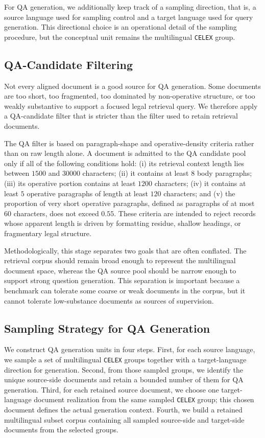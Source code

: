 For QA generation, we additionally keep track of a sampling direction, that is, a source language used for sampling control and a target language used for query generation. This directional choice is an operational detail of the sampling procedure, but the conceptual unit remains the multilingual \texttt{CELEX} group.

\subsection{QA-Candidate Filtering}

Not every aligned document is a good source for QA generation. Some documents are too short, too fragmented, too dominated by non-operative structure, or too weakly substantive to support a focused legal retrieval query. We therefore apply a QA-candidate filter that is stricter than the filter used to retain retrieval documents.

The QA filter is based on paragraph-shape and operative-density criteria rather than on raw length alone. A document is admitted to the QA candidate pool only if all of the following conditions hold: (i) its retrieval context length lies between \(1500\) and \(30000\) characters; (ii) it contains at least \(8\) body paragraphs; (iii) its operative portion contains at least \(1200\) characters; (iv) it contains at least \(5\) operative paragraphs of length at least \(120\) characters; and (v) the proportion of very short operative paragraphs, defined as paragraphs of at most \(60\) characters, does not exceed \(0.55\). These criteria are intended to reject records whose apparent length is driven by formatting residue, shallow headings, or fragmentary legal structure.

Methodologically, this stage separates two goals that are often conflated. The retrieval corpus should remain broad enough to represent the multilingual document space, whereas the QA source pool should be narrow enough to support strong question generation. This separation is important because a benchmark can tolerate some coarse or weak documents in the corpus, but it cannot tolerate low-substance documents as sources of supervision.

\subsection{Sampling Strategy for QA Generation}

We construct QA generation units in four steps. First, for each source language, we sample a set of multilingual \texttt{CELEX} groups together with a target-language direction for generation. Second, from those sampled groups, we identify the unique source-side documents and retain a bounded number of them for QA generation. Third, for each retained source document, we choose one target-language document realization from the same sampled \texttt{CELEX} group; this chosen document defines the actual generation context. Fourth, we build a retained multilingual subset corpus containing all sampled source-side and target-side documents from the selected groups.

